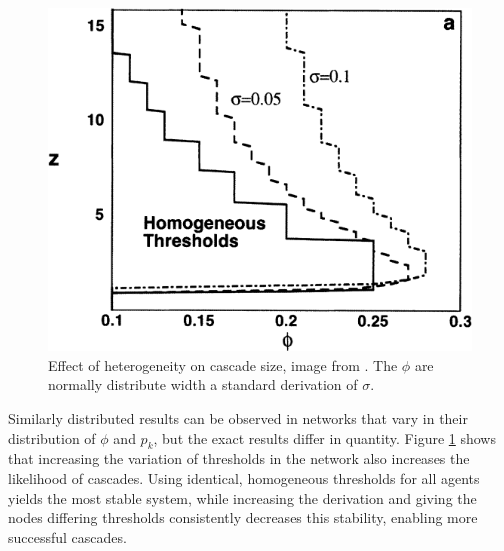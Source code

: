 \documentclass{sig-alternate-05-2015}
\begin{document}
\begin{figure}[h!]
  \centering
  \includegraphics[width=\columnwidth]{img/heterogenity}
  \caption{Effect of heterogeneity on cascade size, image from \cite{simplemodel}. The $\phi$ are normally distribute width a standard derivation of $\sigma$.}
  \label{fig:heterogenity}
\end{figure}

Similarly distributed results can be observed in networks that vary in their distribution of $\phi$ and $p_k$, but the exact results differ in quantity. Figure \ref{fig:heterogenity} shows that increasing the variation of thresholds in the network also increases the likelihood of cascades. Using identical, homogeneous thresholds for all agents yields the most stable system, while increasing the derivation and giving the nodes differing thresholds consistently decreases this stability, enabling more successful cascades.
\end{document}
